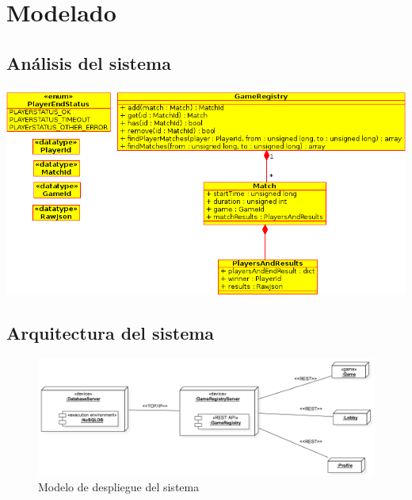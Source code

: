 \chapter{Modelado}

\section{Análisis del sistema}
 \begin{center}
  \includegraphics[scale=0.6]{./class_diagram.png}
 \end{center}


\section{Arquitectura del sistema}
\begin{figure}[h]
 \includegraphics[scale=0.5]{diagrams/deployment_diagram.png}
 \caption{Modelo de despliegue del sistema}
 \label{fig:arquitectura}
\end{figure}
